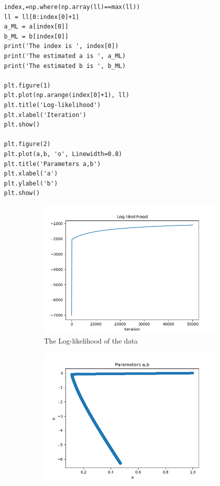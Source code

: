 \documentclass[preprint,12pt]{elsarticle}
\begin{document}
\begin{enumerate}[label=\alph*]
\begin{lstlisting}
index,=np.where(np.array(ll)==max(ll))
ll = ll[0:index[0]+1]
a_ML = a[index[0]]
b_ML = b[index[0]]
print('The index is ', index[0])
print('The estimated a is ', a_ML)
print('The estimated b is ', b_ML)

plt.figure(1)
plt.plot(np.arange(index[0]+1), ll)
plt.title('Log-likelihood')
plt.xlabel('Iteration')
plt.show()

plt.figure(2)
plt.plot(a,b, 'o', Linewidth=0.8)
plt.title('Parameters a,b')
plt.xlabel('a')
plt.ylabel('b')
plt.show()

        \end{lstlisting}

        \begin{figure}[htbp!]
            \center
            \begin{subfigure}{0.8\textwidth}
                \includegraphics[width = \textwidth]{1.png}
                \caption{The Log-likelihood of the data}
                \label{fig:11}
            \end{subfigure}
            \begin{subfigure}{0.8\textwidth}
                \includegraphics[width = \textwidth]{2.png}

\end{subfigure}
\end{figure}
\end{enumerate}
\end{document}
